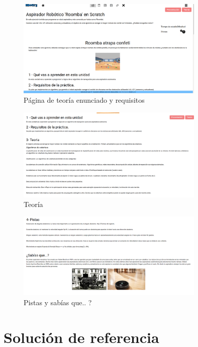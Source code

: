 \begin{figure}[H]
    \centering
    \includegraphics[width=0.8\textwidth, height=0.4\textwidth]{chapters/images/teoria1.png}
    \caption{Página de teoría enunciado y requisitos}
    \label{fig:my_label}
\end{figure}
\begin{figure}[H]
    \centering
    \includegraphics[width=0.8\textwidth, height=0.4\textwidth]{chapters/images/teoria2.png}
    \caption{Teoría}
    \label{fig:my_label}
\end{figure}
\begin{figure}[H]
    \centering
    \includegraphics[width=0.8\textwidth, height=0.4\textwidth]{chapters/images/teoria3.png}
    \caption{Pistas y sabías que.. ?}
    \label{fig:my_label}
\end{figure}



\section{Solución de referencia}

